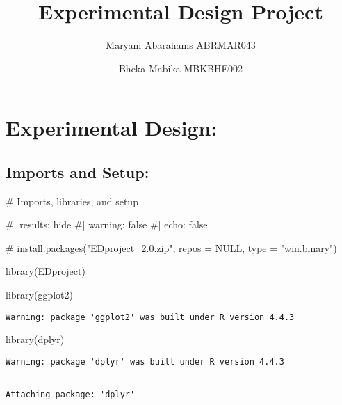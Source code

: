 \documentclass[
  11pt,
  letterpaper,
  DIV=11,
  numbers=noendperiod]{scrartcl}
\title{Experimental Design Project}
\author{Maryam Abarahams ABRMAR043 \and Bheka Mabika MBKBHE002}
\date{}
\newenvironment{Shaded}{}{}
\newcommand{\CommentTok}[1]{\textcolor[rgb]{0.54,0.53,0.53}{#1}}
\newcommand{\FunctionTok}[1]{\textcolor[rgb]{0.39,0.29,0.61}{#1}}
\newcommand{\NormalTok}[1]{\textcolor[rgb]{0.12,0.11,0.11}{#1}}
\renewcommand*\contentsname{Table of contents}
\newcommand\contentsname{Table of contents}
\begin{document}
\maketitle

\renewcommand*\contentsname{Table of contents}
{
\hypersetup{linkcolor=}
\setcounter{tocdepth}{3}
\tableofcontents
}

\section{Experimental Design:}\label{experimental-design}

\subsection{Imports and Setup:}\label{imports-and-setup}

\begin{Shaded}
\begin{Highlighting}[numbers=left,,]
\CommentTok{\# Imports, libraries, and setup }

\CommentTok{\#| results: hide}
\CommentTok{\#| warning: false}
\CommentTok{\#| echo: false}

\CommentTok{\# install.packages("EDproject\_2.0.zip", repos = NULL, type = "win.binary")}

\FunctionTok{library}\NormalTok{(EDproject)}

\FunctionTok{library}\NormalTok{(ggplot2)}
\end{Highlighting}
\end{Shaded}

\begin{verbatim}
Warning: package 'ggplot2' was built under R version 4.4.3
\end{verbatim}

\begin{Shaded}
\begin{Highlighting}[numbers=left,,]
\FunctionTok{library}\NormalTok{(dplyr)}
\end{Highlighting}
\end{Shaded}

\begin{verbatim}
Warning: package 'dplyr' was built under R version 4.4.3
\end{verbatim}

\begin{verbatim}

Attaching package: 'dplyr'
\end{verbatim}
\end{document}
